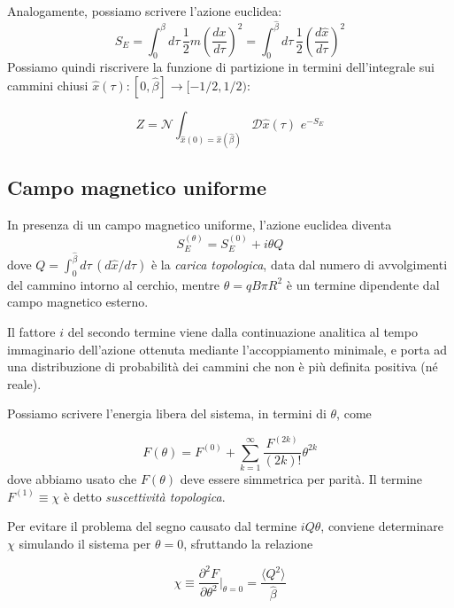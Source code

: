 \documentclass[a4paper,11pt]{article}
\newcommand{\avg}[1]{\langle {#1} \rangle}
\begin{document}
    Analogamente, possiamo scrivere l'azione euclidea:
    \begin{equation}
        S_E = \int_0^\beta d\tau \, \frac{1}{2} m \left(\frac{dx}{d\tau}\right)^2 = \int_0^{\hat{\beta}} d\tau \, \frac{1}{2} \left( \frac{d\hat{x}}{d\tau}\right)^2
    \end{equation}
    Possiamo quindi riscrivere la funzione di partizione in termini dell'integrale sui cammini chiusi $\hat{x}(\tau): [0, \hat{\beta}] \to [-1/2, 1/2)$:
    
    \begin{equation}
        Z = \mathcal{N} \int_{\hat{x}(0) = \hat{x}(\hat{\beta})} \mathcal{D}\hat{x}(\tau) \, \,e^{-S_E}
    \end{equation}

    \subsection{Campo magnetico uniforme}
    In presenza di un campo magnetico uniforme, l'azione euclidea diventa
    \begin{equation}
        S^{(\theta)}_E = S^{(0)}_E + i\theta Q
    \end{equation}
    dove $Q = \int_0^{\hat{\beta}} d\tau \, ({d\hat{x}} / {d\tau})$ è la \emph{carica topologica}, data dal numero di avvolgimenti del cammino intorno al cerchio, mentre $\theta = qB\pi R^2$ è un termine dipendente dal campo magnetico esterno. 
    
    Il fattore $i$ del secondo termine viene dalla continuazione analitica al tempo immaginario dell'azione ottenuta mediante l'accoppiamento minimale, e porta ad una distribuzione di probabilità dei cammini che non è più definita positiva (né reale). 
    
    Possiamo scrivere l'energia libera del sistema, in termini di $\theta$, come
    
    \begin{equation}
        F(\theta) = F^{(0)} + \sum_{k=1}^{\infty} \frac{F^{(2k)}}{(2k)!} \theta^{2k}
    \end{equation}
    dove abbiamo usato che $F(\theta)$ deve essere simmetrica per parità. Il termine $F^{(1)} \equiv \chi$ è detto \emph{suscettività topologica}.
    
    Per evitare il problema del segno causato dal termine $iQ\theta$, conviene determinare $\chi$ simulando il sistema per $\theta = 0$, sfruttando la relazione
    
    \begin{equation}
        \chi \equiv \frac{\partial^2 F}{\partial \theta^2} \bigg\rvert_{\theta = 0} = \frac{\avg{Q^2}}{
        \hat{\beta}}
    \end{equation}
    
\end{document}
